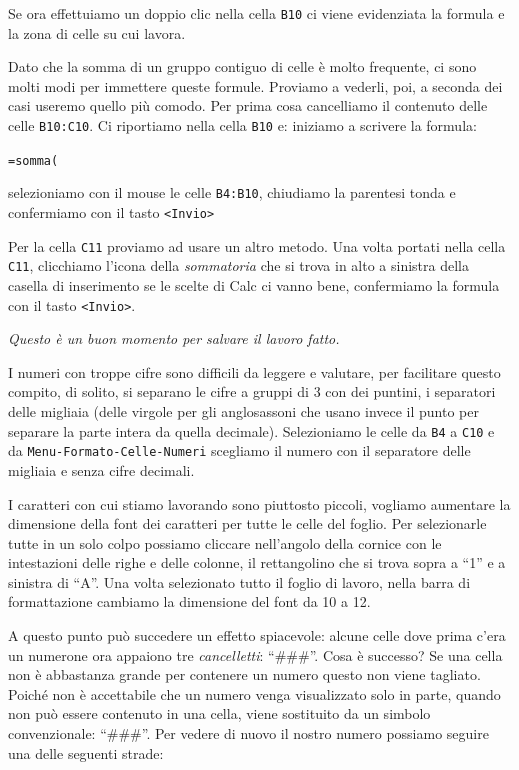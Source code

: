 Se ora effettuiamo un doppio clic nella cella \texttt{B10} ci viene evidenziata 
la
formula e la zona di celle su cui lavora.

Dato che la somma di un gruppo contiguo di celle è molto frequente, ci sono
molti modi per immettere queste formule. Proviamo a vederli, poi, a seconda
dei casi useremo quello più comodo. 
Per prima cosa cancelliamo il contenuto delle celle \texttt{B10:C10}.
Ci riportiamo nella cella \texttt{B10} e: iniziamo a scrivere la formula:

\texttt{=somma(}

selezioniamo con il mouse le celle \texttt{B4:B10},
chiudiamo la parentesi tonda e confermiamo con il tasto 
\texttt{\textless{}Invio\textgreater{}}

Per la cella \texttt{C11} proviamo ad usare un altro metodo.
Una volta portati nella cella \texttt{C11}, clicchiamo l'icona della 
\emph{sommatoria}
che si trova in alto a sinistra della casella di inserimento se le scelte
di Calc ci vanno bene, confermiamo la formula con il tasto 
\texttt{\textless{}Invio\textgreater{}}.

\emph{Questo è un buon momento per salvare il lavoro fatto.}

I numeri con troppe cifre sono difficili da leggere e valutare,
per facilitare questo compito, di solito, si separano le cifre a gruppi di 3
con dei puntini, i separatori delle migliaia
(delle virgole per gli anglosassoni che
usano invece il punto per separare la parte intera da quella decimale).
Selezioniamo le celle da \texttt{B4} a \texttt{C10} e da 
\texttt{Menu-Formato-Celle-Numeri}
scegliamo il numero con il separatore delle migliaia e senza cifre decimali.

I caratteri con cui stiamo lavorando sono piuttosto piccoli, vogliamo
aumentare la dimensione della font dei caratteri per tutte le celle del
foglio. Per selezionarle tutte in un solo colpo possiamo cliccare
nell'angolo della cornice con le intestazioni delle righe e delle colonne,
il rettangolino che si trova sopra a ``1'' e a sinistra di ``A''. Una volta
selezionato tutto il foglio di lavoro, nella barra di formattazione cambiamo
la dimensione del font da 10 a 12.

A questo punto può succedere un effetto spiacevole: alcune celle
dove prima c'era un numerone ora appaiono tre \emph{cancelletti}: ``\#\#\#''.
Cosa è successo? Se una cella non è abbastanza grande per contenere un
numero questo non viene tagliato.
Poiché non è accettabile che un numero venga visualizzato solo in parte,
quando non può essere contenuto in una cella, viene sostituito da un simbolo
convenzionale: ``\#\#\#''.
Per vedere di nuovo il nostro numero possiamo seguire una delle seguenti
strade:

